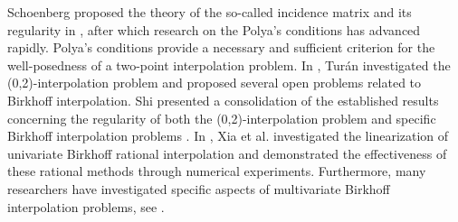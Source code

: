 \documentclass[preprint,12pt]{elsarticle}
\begin{document}
 Schoenberg proposed the theory of the so-called incidence matrix and its regularity in \cite{wen1}, after which research on the Polya's conditions has advanced rapidly. Polya's conditions provide a necessary and sufficient criterion for the well-posedness of a two-point interpolation problem. In \cite{wen2}, Tur\'{a}n investigated the (0,2)-interpolation problem and proposed several open problems related to Birkhoff interpolation. Shi presented a consolidation of the established results concerning the regularity of both the (0,2)-interpolation problem and specific Birkhoff interpolation problems \cite{wen7}. In \cite{ration}, Xia et al. investigated the linearization of univariate Birkhoff rational interpolation and demonstrated the effectiveness of these rational methods through numerical experiments. Furthermore, many researchers have investigated specific aspects of multivariate Birkhoff interpolation problems, see \cite{wen11,wen12,lei,wen14,wen15,k.of}.


\end{document}
